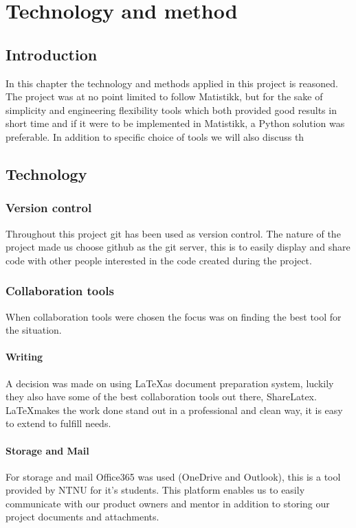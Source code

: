 \chapter{Technology and method}

\section{Introduction}
In this chapter the technology and methods applied in this project is reasoned. The project was at no point limited to follow Matistikk, but for the sake of simplicity and engineering flexibility tools which both provided good results in short time and if it were to be implemented in Matistikk, a Python solution was preferable. In addition to specific choice of tools we will also discuss th

\section{Technology} %

\subsection{Version control}
Throughout this project git has been used as version control. The nature of the project made us choose github as the git server, this is to easily display and share code with other people interested in the code created during the project.  

\subsection{Collaboration tools}
When collaboration tools were chosen the focus was on finding the best tool for the situation.

\subsubsection{Writing}
A decision was made on using \LaTeX as document preparation system, luckily they also have some of the best collaboration tools out there, ShareLatex. \LaTeX makes the work done stand out in a professional and clean way, it is easy to extend to fulfill needs.

\subsubsection{Storage and Mail}
For storage and mail Office365 was used (OneDrive and Outlook), this is a tool provided by NTNU for it's students. This platform enables us to easily communicate with our product owners and mentor in addition to storing our project documents and attachments.

